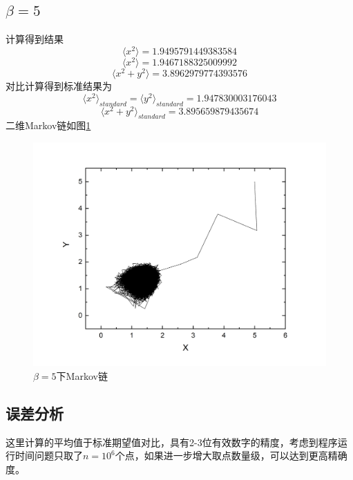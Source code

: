 \documentclass{article}
\begin{document}
	\subsection{$\beta=5$}
计算得到结果
\begin{equation}
	\langle x^2\rangle=1.9495791449383584
\end{equation}
\begin{equation}
	\langle x^2\rangle=1.9467188325009992
\end{equation}
\begin{equation}
	\langle x^2+y^2\rangle=3.8962979774393576 
\end{equation}
对比计算得到标准结果为
\begin{equation}
	\langle x^2\rangle_{standard}=\langle y^2\rangle_{standard}=1.947830003176043
\end{equation}
\begin{equation}
	\langle x^2+ y^2\rangle_{standard}=3.895659879435674
\end{equation}
二维Markov链如图\ref{fig:3}
\begin{figure}[!h]
	
	\centering
	\includegraphics[scale=0.6]{beta5}
	\caption{\heiti{}$ \beta=5 $下Markov链}
	\label{fig:3}
\end{figure}	
	\subsection{误差分析}
	这里计算的平均值于标准期望值对比，具有2-3位有效数字的精度，考虑到程序运行时间问题只取了$  n=10^6 $个点，如果进一步增大取点数量级，可以达到更高精确度。
	
\end{document}
